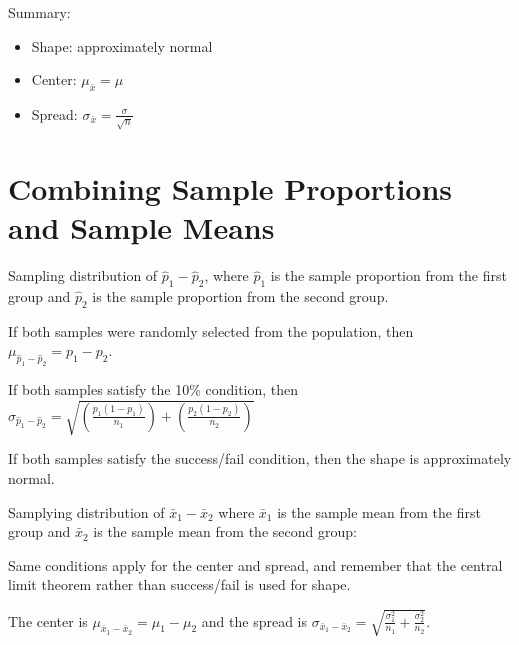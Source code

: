 \documentclass[../stats.tex]{subfiles}
\begin{document}
Summary:
\begin{itemize}
    \item Shape: approximately normal 
    \item Center: $\mu_{\bar{x}} = \mu$
    \item Spread: $\sigma_{\bar{x}} = \frac{\sigma}{\sqrt{n}}$
\end{itemize}

\section{Combining Sample Proportions and Sample Means}
Sampling distribution of $\hat{p}_1-\hat{p}_2$, where $\hat{p}_1$ is the sample proportion from the first group and $\hat{p}_2$ is the sample proportion from the second group.

If both samples were randomly selected from the population, then $\mu_{\hat{p}_1-\hat{p}_2}=p_1-p_2$.

If both samples satisfy the 10\% condition, then $\sigma_{\hat{p}_1-\hat{p}_2}=\sqrt{\left(\frac{p_1(1-p_1)}{n_1}\right)+\left(\frac{p_2(1-p_2)}{n_2}\right)}$

If both samples satisfy the success/fail condition, then the shape is approximately normal.

Samplying distribution of $\bar{x}_1-\bar{x}_2$ where $\bar{x}_1$ is the sample mean from the first group and $\bar{x}_2$ is the sample mean from the second group:

Same conditions apply for the center and spread, and remember that the central limit theorem rather than success/fail is used for shape.

The center is $\mu_{\bar{x}_1-\bar{x}_2}=\mu_1-\mu_2$ and the spread is $\sigma_{\bar{x}_1-\bar{x}_2}=\sqrt{\frac{\sigma_1^2}{n_1}+\frac{\sigma_2^2}{n_2}}$.
\end{document}
